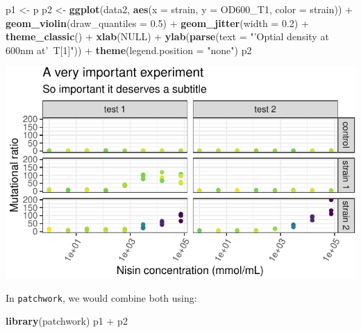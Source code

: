 \documentclass[]{book}
\newenvironment{Shaded}{}{}
\newcommand{\DataTypeTok}[1]{\textcolor[rgb]{0.56,0.13,0.00}{#1}}
\newcommand{\FloatTok}[1]{\textcolor[rgb]{0.25,0.63,0.44}{#1}}
\newcommand{\KeywordTok}[1]{\textcolor[rgb]{0.00,0.44,0.13}{\textbf{#1}}}
\newcommand{\NormalTok}[1]{#1}
\newcommand{\OperatorTok}[1]{\textcolor[rgb]{0.40,0.40,0.40}{#1}}
\newcommand{\OtherTok}[1]{\textcolor[rgb]{0.00,0.44,0.13}{#1}}
\newcommand{\StringTok}[1]{\textcolor[rgb]{0.25,0.44,0.63}{#1}}
\begin{document}
\begin{Shaded}
\begin{Highlighting}[]
\NormalTok{p1 <-}\StringTok{ }\NormalTok{p}
\NormalTok{p2 <-}\StringTok{ }\KeywordTok{ggplot}\NormalTok{(data2, }\KeywordTok{aes}\NormalTok{(}\DataTypeTok{x =}\NormalTok{ strain, }\DataTypeTok{y =}\NormalTok{ OD600_T1, }\DataTypeTok{color =}\NormalTok{ strain)) }\OperatorTok{+}
\StringTok{  }\KeywordTok{geom_violin}\NormalTok{(}\DataTypeTok{draw_quantiles =} \FloatTok{0.5}\NormalTok{) }\OperatorTok{+}
\StringTok{  }\KeywordTok{geom_jitter}\NormalTok{(}\DataTypeTok{width =} \FloatTok{0.2}\NormalTok{) }\OperatorTok{+}
\StringTok{  }\KeywordTok{theme_classic}\NormalTok{() }\OperatorTok{+}
\StringTok{  }\KeywordTok{xlab}\NormalTok{(}\OtherTok{NULL}\NormalTok{) }\OperatorTok{+}
\StringTok{  }\KeywordTok{ylab}\NormalTok{(}\KeywordTok{parse}\NormalTok{(}\DataTypeTok{text =} \StringTok{"'Optial density at 600nm at'~T[1]"}\NormalTok{)) }\OperatorTok{+}
\StringTok{  }\KeywordTok{theme}\NormalTok{(}\DataTypeTok{legend.position =} \StringTok{"none"}\NormalTok{)}
\NormalTok{p2}
\end{Highlighting}
\end{Shaded}

\begin{center}\includegraphics[width=\textwidth]{TRES-Tidy-Tutorial_files/figure-latex/unnamed-chunk-147-1} \end{center}

In \texttt{patchwork}, we would combine both using:

\begin{Shaded}
\begin{Highlighting}[]
\KeywordTok{library}\NormalTok{(patchwork)}
\NormalTok{p1 }\OperatorTok{+}\StringTok{ }\NormalTok{p2}
\end{Highlighting}
\end{Shaded}
\end{document}
